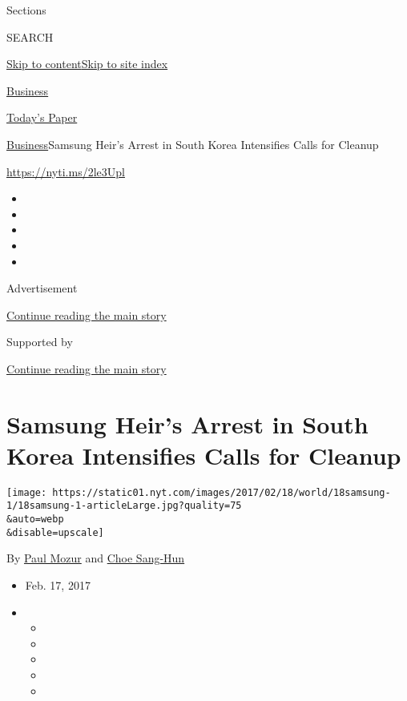Sections

SEARCH

\protect\hyperlink{site-content}{Skip to
content}\protect\hyperlink{site-index}{Skip to site index}

\href{https://www.nytimes.com/section/business}{Business}

\href{https://myaccount.nytimes.com/auth/login?response_type=cookie\&client_id=vi}{}

\href{https://www.nytimes.com/section/todayspaper}{Today's Paper}

\href{/section/business}{Business}\textbar{}Samsung Heir's Arrest in
South Korea Intensifies Calls for Cleanup

\url{https://nyti.ms/2le3Upl}

\begin{itemize}
\item
\item
\item
\item
\item
\end{itemize}

Advertisement

\protect\hyperlink{after-top}{Continue reading the main story}

Supported by

\protect\hyperlink{after-sponsor}{Continue reading the main story}

\hypertarget{samsung-heirs-arrest-in-south-korea-intensifies-calls-for-cleanup}{%
\section{Samsung Heir's Arrest in South Korea Intensifies Calls for
Cleanup}\label{samsung-heirs-arrest-in-south-korea-intensifies-calls-for-cleanup}}

\texttt{[image: https://static01.nyt.com/images/2017/02/18/world/18samsung-1/18samsung-1-articleLarge.jpg?quality=75\\\&auto=webp\\\&disable=upscale]}

By \href{https://www.nytimes.com/by/paul-mozur}{Paul Mozur} and
\href{http://www.nytimes.com/by/choe-sang-hun}{Choe Sang-Hun}

\begin{itemize}
\item
  Feb. 17, 2017
\item
  \begin{itemize}
  \item
  \item
  \item
  \item
  \item
  \end{itemize}
\end{itemize}

